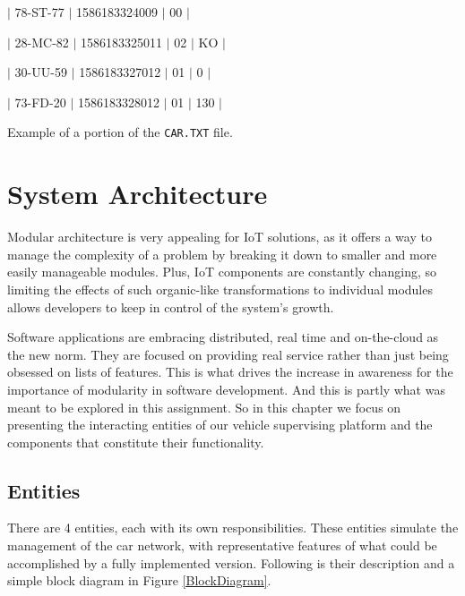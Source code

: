 \documentclass[12pt]{article}
\begin{document}
$|$ 78-ST-77 $|$ 1586183324009 $|$ 00 $|$

$|$ 28-MC-82 $|$ 1586183325011 $|$ 02 $|$ KO $|$

$|$ 30-UU-59 $|$ 1586183327012 $|$ 01 $|$ 0 $|$

$|$ 73-FD-20 $|$ 1586183328012 $|$ 01 $|$ 130 $|$

Example of a portion of the \texttt{CAR.TXT} file.

\newpage 
\section{System Architecture} %

Modular architecture is very appealing for IoT solutions, as it offers a way to manage the complexity of a problem by breaking it down to smaller and more 
easily manageable modules.
Plus, IoT components are constantly changing, so limiting the effects of such organic-like transformations to individual modules allows developers to keep in 
control of the system's growth.

Software applications are embracing distributed, real time and on-the-cloud as the new norm. 
They are focused on providing real service rather than just being obsessed on lists of features.
This is what drives the increase in awareness for the importance of modularity in software development.
And this is partly what was meant to be explored in this assignment.
So in this chapter we focus on presenting the interacting entities of our vehicle supervising platform and the components that constitute their functionality.

\subsection{Entities} %

There are 4 entities, each with its own responsibilities.
These entities simulate the management of the car network, with representative features of what could be accomplished by a fully implemented version.
Following is their description and a simple block diagram in Figure \ref{BlockDiagram}.
\end{document}

